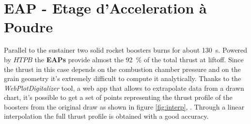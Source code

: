 \documentclass[12pt,fleqn,openany]{book} %
\begin{document}
\section{EAP - Etage d’Acceleration à Poudre}
Parallel to the sustainer two solid rocket boosters burns for about \SI{130}{s}. Powered by $HTPB$ the \textbf{EAPs} provide almost the \SI{92}{\%} of the total thrust at liftoff. Since the thrust in this case depends on the combustion chamber pressure and on the grain geometry it's extremely difficult to compute it analytically. Thanks to the \textit{WebPlotDigitalizer} tool, a web app that allows to extrapolate data from a drawn chart, it's possible to get a set of points representing the thrust profile of the boosters from the original draw as shown in figure \hypertarget{fig:interp}{\ref{fig:interp}}, \cite{bib:8}. Through a linear interpolation the full thrust profile is obtained with a good accuracy.                                     

\end{document}
